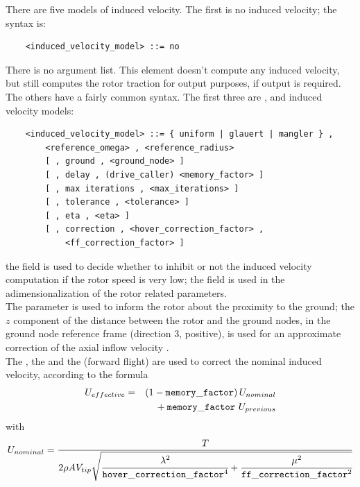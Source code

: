 \noindent
There are five models of induced velocity. 
The first is no induced velocity; the syntax is:
\begin{verbatim}
    <induced_velocity_model> ::= no
\end{verbatim}
There is no argument list. This element doesn't compute any induced
velocity, but still computes the rotor traction for output purposes,
if output is required.
The others have a fairly common syntax.  The first three are
,  and  induced velocity
models:
\begin{verbatim}
    <induced_velocity_model> ::= { uniform | glauert | mangler } , 
        <reference_omega> , <reference_radius> 
        [ , ground , <ground_node> ]
        [ , delay , (drive_caller) <memory_factor> ]
        [ , max iterations , <max_iterations> ]
        [ , tolerance , <tolerance> ]
        [ , eta , <eta> ]
        [ , correction , <hover_correction_factor> ,
            <ff_correction_factor> ]
\end{verbatim}
the  field is used to decide whether to inhibit
or not the induced velocity computation if the rotor speed is very low;
the  field is used in the adimensionalization
of the rotor related parameters. \\
The  parameter is used to inform the rotor about the proximity
to the ground; the $z$ component of the distance between the rotor
and the ground nodes, in the ground node reference frame
(direction 3, positive),
is used for an approximate correction of the axial inflow velocity
\cite{NASA-TR-3021}. \\
The , the  
and the  (forward flight) are
used to correct the nominal induced velocity, according to the formula
\begin{eqnarray*}
	U_{effective} & = &
	\left( 1 - \mathtt{memory\_factor} \right) 
		U_{nominal} \\
	& & \mbox{} + \mathtt{memory\_factor} \ U_{previous}
\end{eqnarray*}
with
\begin{displaymath}
	U_{nominal} = \frac{T}{2 \rho A V_{tip} \sqrt{
		\cfrac{\lambda^2}{\mathtt{hover\_correction\_factor}^4}
		+ \cfrac{\mu^2}{\mathtt{ff\_correction\_factor}^2}
	}}
\end{displaymath}
